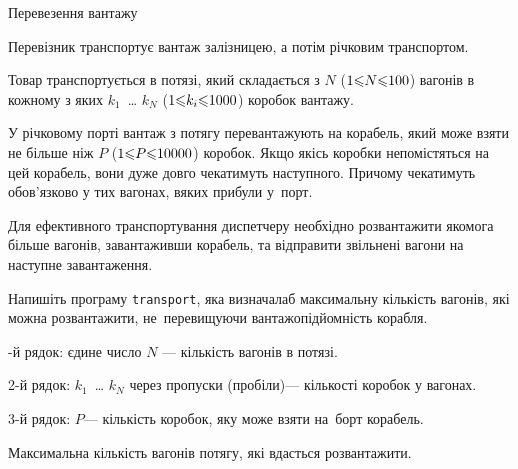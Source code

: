 \begin{problemAllDefault}{Перевезення вантажу}

Перевізник транспортує вантаж залізницею, а потім річковим транспортом.

Товар транспортується в потязі, який складається з $N$ ($1{\leqslant}N{\leqslant}100$) вагонів в кожному з яких $k_1$~\dots{} $k_N$ ($1{\leqslant}k_i{\leqslant}1000$) коробок вантажу.

У річковому порті вантаж з потягу перевантажують на корабель, який може взяти не більше ніж $P$ ($1{\leqslant}P{\leqslant}10000$) коробок. Якщо якісь коробки не\nolinebreak[3] помістяться на цей корабель, вони дуже довго чекатимуть наступного. Причому чекатимуть обов'язково у тих вагонах, в\nolinebreak[3] яких прибули у~порт.

Для ефективного транспортування диспетчеру необхідно розвантажити якомога більше вагонів, завантаживши корабель, та відправити звільнені вагони на наступне завантаження.

\Task	Напишіть програму \texttt{transport}, яка визначала\nolinebreak[3] б максимальну кількість вагонів, які можна розвантажити, не~перевищуючи вантажопідйомність корабля.

-й рядок: єдине число $N$ --- кількість вагонів в потязі.

2-й рядок: $k_1$~\dots{} $k_N$ через пропуски (пробіли)\nolinebreak[3] --- кількості коробок у вагонах.

3-й рядок: $P$\nolinebreak[3] --- кількість коробок, яку може взяти на~борт корабель.


\OutputFile Максимальна кількість вагонів потягу, які вдасться розвантажити.


\Example
\begin{exampleSimple}{5em}{3em}%
%
\end{exampleSimple}

\end{problemAllDefault}
